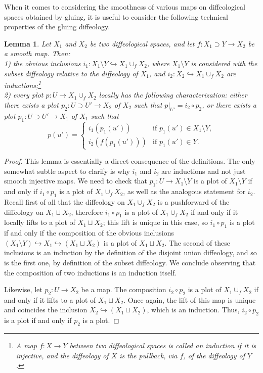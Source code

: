 \documentclass{article}
\newtheorem{lemma}{Lemma}[section]
\begin{document}
When it comes to considering the smoothness of various maps on diffeological spaces obtained by gluing, it is useful to consider the following technical properties of the gluing diffeology.

\begin{lemma}\label{describe:plots:gluing:diffeol:lem}
Let $X_1$ and $X_2$ be two diffeological spaces, and let $f:X_1\supset Y\to X_2$ be a smooth map. Then:\\
1) the obvious inclusions $i_1:X_1\setminus Y\hookrightarrow X_1\cup_f X_2$, where $X_1\setminus Y$ is considered with the subset diffeology relative to the diffeology of $X_1$, and
$i_2:X_2\hookrightarrow X_1\cup_f X_2$ are inductions;\footnote{A map $f:X\to Y$ between two diffeological spaces is called an induction if it is injective, and the diffeology of $X$ is the pullback, via $f$, of 
the diffeology of $Y$.}\\
2) every plot $p:U\to X_1\cup_f X_2$ locally has the following characterization: either there exists a plot $p_2:U\supset U'\to X_2$ of $X_2$ such that $p|_{U'}=i_2\circ p_2$, or there exists a plot 
$p_1:U\supset U'\to X_1$ of $X_1$ such that 
$$p(u')=\left\{\begin{array}{ll}i_1(p_1(u')) & \mbox{if }p_1(u')\in X_1\setminus Y,\\ i_2(f(p_1(u'))) & \mbox{if }p_1(u')\in Y.\end{array}\right.$$
\end{lemma}

\begin{proof}
This lemma is essentially a direct consequence of the definitions. The only somewhat subtle aspect to clarify is why $i_1$ and $i_2$ are inductions and not just smooth injective maps. We need to check
that $p_1:U\to X_1\setminus Y$ is a plot of $X_1\setminus Y$ if and only if $i_1\circ p_1$ is a plot of $X_1\cup_f X_2$, as well as the analogous statement for $i_2$. Recall first of all that the diffeology on 
$X_1\cup_f X_2$ is a pushforward of the diffeology on $X_1\sqcup X_2$, therefore $i_1\circ p_1$ is a plot of $X_1\cup_f X_2$ if and only if it locally lifts to a plot of $X_1\sqcup X_2$; this lift is unique in this 
case, so $i_1\circ p_1$ is a plot if and only if the composition of the obvious inclusions $(X_1\setminus Y)\hookrightarrow X_1\hookrightarrow (X_1\sqcup X_2)$ is a plot of $X_1\sqcup X_2$. The second of 
these inclusions is an induction by the definition of the disjoint union diffeology, and so is the first one, by definition of the subset diffeology. We conclude observing that the composition of two inductions is an 
induction itself.

Likewise, let $p_2:U\to X_2$ be a map. The composition $i_2\circ p_2$ is a plot of $X_1\cup_f X_2$ if and only if it lifts to a plot of $X_1\sqcup X_2$. Once again, the lift of this map is unique and coincides 
the inclusion $X_2\hookrightarrow(X_1\sqcup X_2)$, which is an induction. Thus, $i_2\circ p_2$ is a plot if and only if $p_2$ is a plot.
\end{proof}
\end{document}

